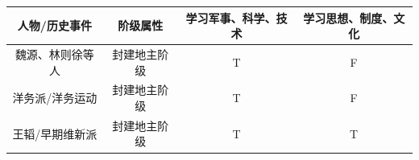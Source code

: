 \documentclass[10pt, UTF8]{book} %
\begin{document}
\begin{mdframed}[frametitle={救亡图存的各种尝试}]
    \begin{table}[H]
        \centering
        \begin{tabular}{c c c c}
            \toprule
            人物/历史事件 & 阶级属性 & 学习军事、科学、技术 & 学习思想、制度、文化 \\
            \midrule
            魏源、林则徐等人 & 封建地主阶级 & T & F \\
            洋务派/洋务运动 & 封建地主阶级 & T & F \\
            王韬/早期维新派 & 封建地主阶级 & T & T \\
            \bottomrule
        \end{tabular}        
    \end{table}
\end{mdframed}










\end{document}
